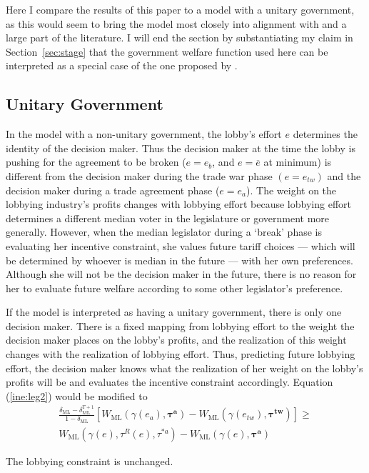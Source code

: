 \documentclass[authoryear, review]{elsarticle}
\newcommand{\ov}{\overline}
\newcommand{\bta}{\bm{\tau^a}}
\newcommand{\ga}{\gamma}
\newcommand{\btw}{\bm{\tau^{tw}}}
\newcommand{\de}{\delta}
\begin{document}
Here I compare the results of this paper to a model with a unitary government, as this would seem to bring the model most closely into alignment with \citet{mrc2007} and a large part of the literature. I will end the section by substantiating my claim in Section~\ref{sec:stage} that the government welfare function used here can be interpreted as a special case of the one proposed by \citet{dgh97}.

\subsection{Unitary Government}
In the model with a non-unitary government, the lobby's effort $e$ determines the identity of the decision maker. Thus the decision maker at the time the lobby is pushing for the agreement to be broken ($e=e_b$, and $e=\ov{e}$ at minimum) is different from the decision maker during the trade war phase $(e = e_{tw})$ and the decision maker during a trade agreement phase ($e=e_a$). The weight on the lobbying industry's profits changes with lobbying effort because lobbying effort determines a different median voter in the legislature or government more generally. However, when the median legislator during a `break' phase is evaluating her incentive constraint, she values future tariff choices --- which will be determined by whoever is median in the future --- with her own preferences. Although she will not be the decision maker in the future, there is no reason for her to evaluate future welfare according to some other legislator's preference.

If the model is interpreted as having a unitary government, there is only one decision maker. There is a fixed mapping from lobbying effort to the weight the decision maker places on the lobby's profits, and the realization of this weight changes with the realization of lobbying effort. Thus, predicting future lobbying effort, the decision maker knows what the realization of her weight on the lobby's profits will be and evaluates the incentive constraint accordingly. Equation (\ref{ine:leg2}) would be modified to
\begin{multline}
  \frac{\de_\text{ML} - \de_\text{ML}^{T+1}}{1-\de_\text{ML}} \left[W_\text{ML}(\ga(e_a),\bta) - W_{\text{ML}}(\ga(e_{tw}),\btw) \right] \geq \\
	W_{\text{ML}}(\ga(e),\tau^R(e),\tau^{*a}) - W_{\text{ML}}(\ga(e),\bta)
  \label{ine:leg3}
\end{multline}

The lobbying constraint is unchanged.
\end{document}
